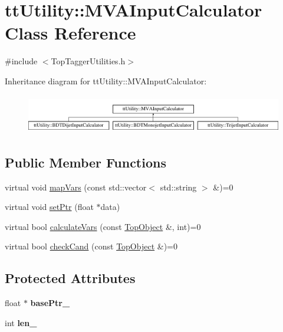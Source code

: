 \hypertarget{classttUtility_1_1MVAInputCalculator}{\section{tt\-Utility\-:\-:M\-V\-A\-Input\-Calculator Class Reference}
\label{classttUtility_1_1MVAInputCalculator}
}


{\ttfamily \#include $<$Top\-Tagger\-Utilities.\-h$>$}

Inheritance diagram for tt\-Utility\-:\-:M\-V\-A\-Input\-Calculator\-:\begin{figure}[H]
\begin{center}
\leavevmode
\includegraphics[height=1.728395cm]{classttUtility_1_1MVAInputCalculator}
\end{center}
\end{figure}
\subsection*{Public Member Functions}
\begin{DoxyCompactItemize}
\item 
virtual void \hyperlink{classttUtility_1_1MVAInputCalculator_aca315e5c5ce1d110660eb54cd7facfd8}{map\-Vars} (const std\-::vector$<$ std\-::string $>$ \&)=0
\item 
virtual void \hyperlink{classttUtility_1_1MVAInputCalculator_afae8a686f0fd4310a75c79216a39fa53}{set\-Ptr} (float $\ast$data)
\item 
virtual bool \hyperlink{classttUtility_1_1MVAInputCalculator_a86793cfa66ca816b2e1667a6b12db7d8}{calculate\-Vars} (const \hyperlink{classTopObject}{Top\-Object} \&, int)=0
\item 
virtual bool \hyperlink{classttUtility_1_1MVAInputCalculator_ae8df426d7943b921c0b9d086d1ccde30}{check\-Cand} (const \hyperlink{classTopObject}{Top\-Object} \&)=0
\end{DoxyCompactItemize}
\subsection*{Protected Attributes}
\begin{DoxyCompactItemize}
\item 
\hypertarget{classttUtility_1_1MVAInputCalculator_ae7ecc7c4f0679e8adbb09104362f77e9}{float $\ast$ {\bfseries base\-Ptr\-\_\-}}\label{classttUtility_1_1MVAInputCalculator_ae7ecc7c4f0679e8adbb09104362f77e9}

\item 
\hypertarget{classttUtility_1_1MVAInputCalculator_aef257aed71b9b66adfb59b1807c8f0a4}{int {\bfseries len\-\_\-}}\label{classttUtility_1_1MVAInputCalculator_aef257aed71b9b66adfb59b1807c8f0a4}

\end{DoxyCompactItemize}


